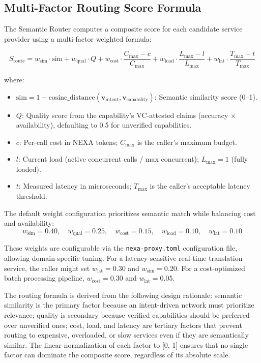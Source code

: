 \subsection{Multi-Factor Routing Score Formula}

The Semantic Router computes a composite score for each candidate service provider using a multi-factor weighted formula:

\begin{equation}
S_{\text{route}} = w_{\text{sim}} \cdot \text{sim} + w_{\text{qual}} \cdot Q + w_{\text{cost}} \cdot \frac{C_{\max} - c}{C_{\max}} + w_{\text{load}} \cdot \frac{L_{\max} - l}{L_{\max}} + w_{\text{lat}} \cdot \frac{T_{\max} - t}{T_{\max}}
\label{eq:routing}
\end{equation}

where:
\begin{itemize}
  \item $\text{sim} = 1 - \text{cosine\_distance}(\mathbf{v}_{\text{intent}}, \mathbf{v}_{\text{capability}})$: Semantic similarity score (0--1).
  \item $Q$: Quality score from the capability's VC-attested claims (accuracy $\times$ availability), defaulting to 0.5 for unverified capabilities.
  \item $c$: Per-call cost in NEXA tokens; $C_{\max}$ is the caller's maximum budget.
  \item $l$: Current load (active concurrent calls / max concurrent); $L_{\max} = 1$ (fully loaded).
  \item $t$: Measured latency in microseconds; $T_{\max}$ is the caller's acceptable latency threshold.
\end{itemize}

The default weight configuration prioritizes semantic match while balancing cost and availability:
\begin{equation}
w_{\text{sim}} = 0.40, \quad w_{\text{qual}} = 0.25, \quad w_{\text{cost}} = 0.15, \quad w_{\text{load}} = 0.10, \quad w_{\text{lat}} = 0.10
\end{equation}

These weights are configurable via the \texttt{nexa-proxy.toml} configuration file, allowing domain-specific tuning. For a latency-sensitive real-time translation service, the caller might set $w_{\text{lat}} = 0.30$ and $w_{\text{sim}} = 0.20$. For a cost-optimized batch processing pipeline, $w_{\text{cost}} = 0.30$ and $w_{\text{lat}} = 0.05$.

The routing formula is derived from the following design rationale: semantic similarity is the primary factor because an intent-driven network must prioritize relevance; quality is secondary because verified capabilities should be preferred over unverified ones; cost, load, and latency are tertiary factors that prevent routing to expensive, overloaded, or slow services even if they are semantically similar. The linear normalization of each factor to [0, 1] ensures that no single factor can dominate the composite score, regardless of its absolute scale.

